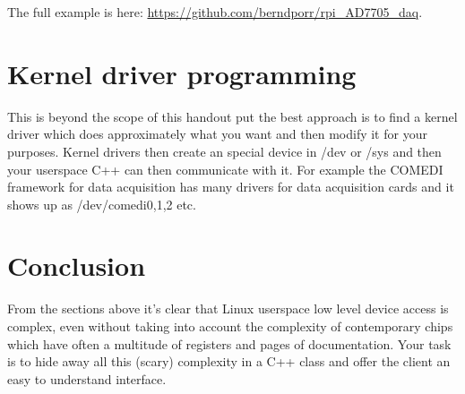 \documentclass[12pt]{report}
\begin{document}
The full example is here: \url{https://github.com/berndporr/rpi_AD7705_daq}.


\section{Kernel driver programming}
This is beyond the scope of this handout put the best approach is to find a kernel
driver which does approximately what you want and then modify it for your purposes.
Kernel drivers then create an special device in /dev or /sys and then your userspace
C++ can then communicate with it. For example the COMEDI framework for data acquisition
has many drivers for data acquisition cards and it shows up as /dev/comedi0,1,2 etc.

\section{Conclusion}
From the sections above it's clear that Linux userspace low level
device access is complex, even without taking into account the
complexity of contemporary chips which have often a multitude of
registers and pages of documentation. Your task is to hide away
all this (scary) complexity in a C++ class and offer the client
an easy to understand interface.
\end{document}
